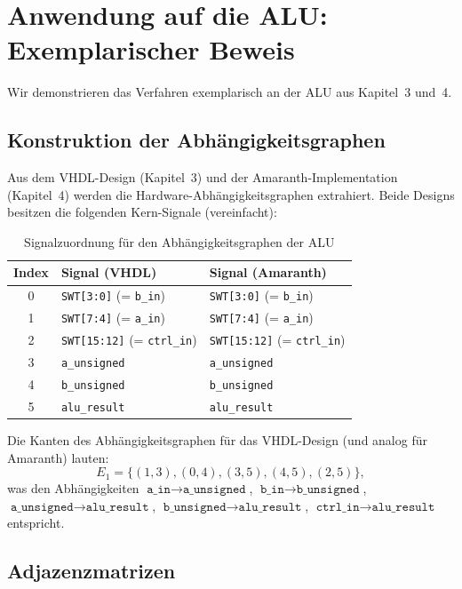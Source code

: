﻿\documentclass[12pt,a4paper]{report}
\begin{document}
\section{Anwendung auf die ALU: Exemplarischer Beweis}
\label{subsec:alu_beispiel}

Wir demonstrieren das Verfahren exemplarisch an der ALU aus Kapitel~3 und~4.

\subsection{Konstruktion der Abhängigkeitsgraphen}

Aus dem VHDL-Design (Kapitel~3) und der Amaranth-Implementation (Kapitel~4) werden die Hardware-Abhängigkeitsgraphen extrahiert. Beide Designs besitzen die folgenden Kern-Signale (vereinfacht):

\begin{table}[H]
\centering
\begin{tabular}{|c|l|l|}
\hline
\textbf{Index} & \textbf{Signal (VHDL)} & \textbf{Signal (Amaranth)} \\
\hline
0 & \texttt{SWT[3:0]} (= \texttt{b\_in}) & \texttt{SWT[3:0]} (= \texttt{b\_in}) \\
1 & \texttt{SWT[7:4]} (= \texttt{a\_in}) & \texttt{SWT[7:4]} (= \texttt{a\_in}) \\
2 & \texttt{SWT[15:12]} (= \texttt{ctrl\_in}) & \texttt{SWT[15:12]} (= \texttt{ctrl\_in}) \\
3 & \texttt{a\_unsigned} & \texttt{a\_unsigned} \\
4 & \texttt{b\_unsigned} & \texttt{b\_unsigned} \\
5 & \texttt{alu\_result} & \texttt{alu\_result} \\
\hline
\end{tabular}
\caption{Signalzuordnung für den Abhängigkeitsgraphen der ALU}
\end{table}

Die Kanten des Abhängigkeitsgraphen für das VHDL-Design (und analog für Amaranth) lauten:
\[
E_1 = \{(1,3), (0,4), (3,5), (4,5), (2,5)\},
\]
was den Abhängigkeiten $\texttt{a\_in} \to \texttt{a\_unsigned}$, $\texttt{b\_in} \to \texttt{b\_unsigned}$, $\texttt{a\_unsigned} \to \texttt{alu\_result}$, $\texttt{b\_unsigned} \to \texttt{alu\_result}$, $\texttt{ctrl\_in} \to \texttt{alu\_result}$ entspricht.

\subsection{Adjazenzmatrizen}
\end{document}

